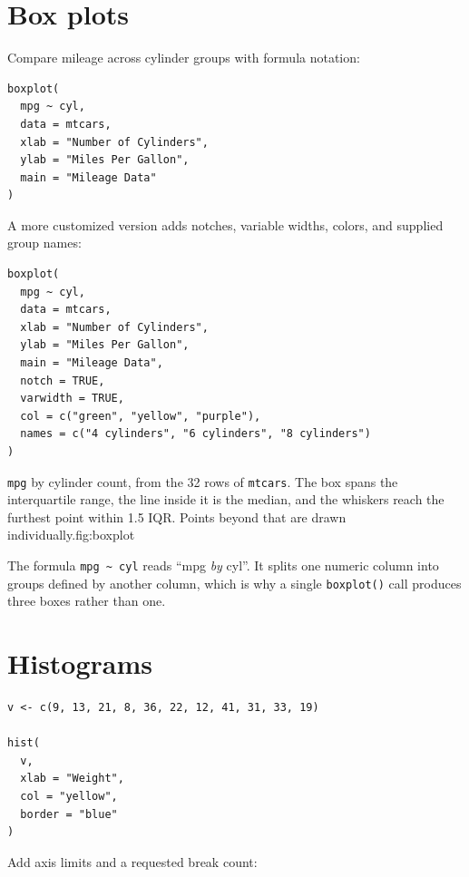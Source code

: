 \section{Box plots}

Compare mileage across cylinder groups with formula notation:

\begin{lstlisting}[style=dsr]
boxplot(
  mpg ~ cyl,
  data = mtcars,
  xlab = "Number of Cylinders",
  ylab = "Miles Per Gallon",
  main = "Mileage Data"
)
\end{lstlisting}

A more customized version adds notches, variable widths, colors, and supplied group names:

\begin{lstlisting}[style=dsr]
boxplot(
  mpg ~ cyl,
  data = mtcars,
  xlab = "Number of Cylinders",
  ylab = "Miles Per Gallon",
  main = "Mileage Data",
  notch = TRUE,
  varwidth = TRUE,
  col = c("green", "yellow", "purple"),
  names = c("4 cylinders", "6 cylinders", "8 cylinders")
)
\end{lstlisting}

\begin{utpfig}{\texttt{mpg} by cylinder count, from the 32 rows of
\texttt{mtcars}. The box spans the interquartile range, the line inside it is
the median, and the whiskers reach the furthest point within 1.5 IQR. Points
beyond that are drawn individually.}{fig:boxplot}

\end{utpfig}

\begin{keyidea}
The formula \texttt{mpg \textasciitilde{} cyl} reads ``mpg \emph{by} cyl''.
It splits one numeric column into groups defined by another column, which is
why a single \texttt{boxplot()} call produces three boxes rather than one.
\end{keyidea}

\section{Histograms}

\begin{lstlisting}[style=dsr]
v <- c(9, 13, 21, 8, 36, 22, 12, 41, 31, 33, 19)

hist(
  v,
  xlab = "Weight",
  col = "yellow",
  border = "blue"
)
\end{lstlisting}

Add axis limits and a requested break count:

